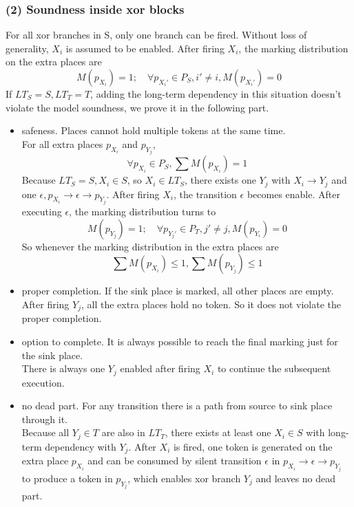 \subsubsection{(2) Soundness inside xor blocks}
For all xor branches in S, only one branch can be fired. Without loss of generality, $X_i$ is assumed to be enabled. After firing $X_i$, the marking distribution on the extra places are  
\[ M(p_{X_i}) = 1; \quad 
\forall p_{X_i\prime} \in P_S, i\prime \neq i, M(p_{X_i\prime})=0 \]
If $ LT_S = S, LT_T=T$, adding the long-term dependency in this situation doesn't violate the model soundness, we prove it in the following part.\\
\begin{itemize}
	\item safeness. Places cannot hold multiple tokens at the same time.\\
	For all extra places $p_{X_i}$ and $p_{Y_j}$, 
	\[\forall p_{X_i} \in P_S, \sum M(p_{X_i})=1\]
	Because $ LT_S = S, X_i \in S$, so $X_i \in LT_S$, there exists one $Y_j$ with $X_i \rightarrow Y_j$ and one $\epsilon, p_{X_i} \rightarrow \epsilon
	\rightarrow p_{Y_{j}} $.  After firing $X_i$, the transition $\epsilon$ becomes enable. After executing $\epsilon$, the marking distribution turns to 
	\[ M(p_{Y_j}) = 1;\quad 
	\forall p_{Y_j\prime} \in P_T, j\prime \neq j,  M(p_{Y_i})=0 \]
	So whenever the marking distribution in the extra places are
	\[\sum M(p_{X_i}) \leq 1,  \sum M(p_{Y_j}) \leq 1 \] 
	\item proper completion. If the sink place is marked, all other places are empty. \\
	After firing $Y_j$, all the extra places hold no token. So it does not violate the proper completion.
	\item option to complete.  It is always possible to reach the final marking just for the sink place. \\
	There is always one $Y_j$ enabled after firing $X_i$ to continue the subsequent execution.
	\item no dead part. For any transition there is a path from source to sink place through it. \\
	Because all $Y_j \in T$ are also in $LT_T$, there exists at least one $X_i\in S$ with long-term dependency with $Y_j$. After $X_i$ is fired, one token is generated on the extra place $p_{X_i}$ and can be consumed by silent transition $\epsilon$ in  $p_{X_i} \rightarrow \epsilon \rightarrow p_{Y_{j}}$ to produce a token in $p_{Y_j}$, which enables xor branch $Y_j$ and leaves no dead part.
\end{itemize}

